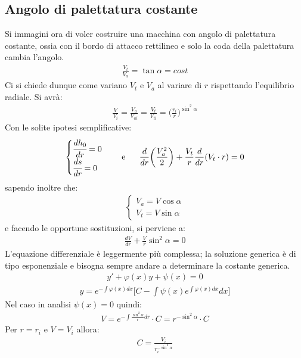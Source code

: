 \subsection{Angolo di palettatura costante}
Si immagini ora di voler costruire una macchina con angolo di palettatura costante, ossia con il bordo di attacco rettilineo e solo la coda della palettatura cambia l'angolo.
\begin{align*}
\frac{V_t}{V_a} = \tan \alpha = cost
\end{align*}
Ci si chiede dunque come variano $V_t$ e $V_a$ al variare di $r$ rispettando l'equilibrio radiale.
Si avrà:
\begin{align*}
\frac{V}{V_i} = \frac{V_a}{V_{ai}} = \frac{V_t}{V_{ti}} = \bigg(\frac{r_i}{r} \bigg)^{\sin^2 \alpha}
\end{align*}
Con le solite ipotesi semplificative:
\begin{align*}
\begin{cases}
\cfrac{dh_0}{dr} = 0\\
\cfrac{ds}{dr} = 0 
\end{cases} \;\;\;\; \text{e} \;\;\;\;\;\;
\frac{d}{dr} \bigg(\frac{V_a^2}{2} \bigg) + \frac{V_t}{r} \frac{d}{dr}(V_t \cdot r) = 0
\end{align*}
sapendo inoltre che:
\begin{align*}
\begin{cases}
V_a = V \cos \alpha\\
V_t = V \sin \alpha
\end{cases}
\end{align*}
e facendo le opportune sostituzioni, si perviene a:
\begin{align*}
\frac{dV}{dr} + \frac{V}{r} \sin^2 \alpha = 0
\end{align*}
L'equazione differenziale è leggermente più complessa; la soluzione generica è di tipo esponenziale e bisogna sempre andare a determinare la costante generica.
\begin{align*}
y' + \varphi(x)y + \psi(x) = 0 
\end{align*}
\begin{align*}
y = e^{-\int \varphi(x)dx} \bigg[ C- \int \psi(x) e^{\int \varphi(x)dx} dx \bigg] 
\end{align*}
Nel caso in analisi $\psi(x) = 0$ quindi:
\begin{align*}
V = e^{-\int \frac{\sin^2 \alpha}{r}dr}\cdot C = r^{-\sin^2 \alpha} \cdot C
\end{align*}
Per $r=r_i$ e $V=V_i$ allora:
\begin{align*}
C = \frac{V_i}{r_i^{-\sin^2 \alpha}}
\end{align*}
